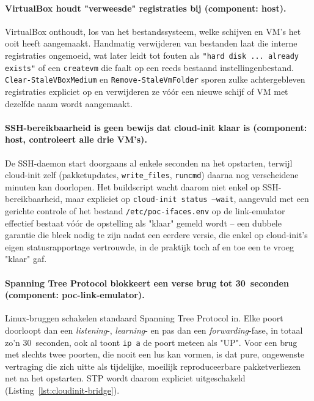 \paragraph{VirtualBox houdt "verweesde" registraties bij (component: host).} VirtualBox
onthoudt, los van het bestandssysteem, welke schijven en VM's het ooit heeft aangemaakt.
Handmatig verwijderen van bestanden laat die interne registraties ongemoeid, wat later
leidt tot fouten als \texttt{"hard disk ... already exists"} of een \texttt{createvm} die
faalt op een reeds bestaand instellingenbestand. \texttt{Clear-StaleVBoxMedium} en
\texttt{Remove-StaleVmFolder} sporen zulke achtergebleven registraties expliciet op en
verwijderen ze vóór een nieuwe schijf of VM met dezelfde naam wordt aangemaakt.

\paragraph{SSH-bereikbaarheid is geen bewijs dat cloud-init klaar is (component: host,
controleert alle drie VM's).} De SSH-daemon start doorgaans al enkele seconden na het
opstarten, terwijl cloud-init zelf (pakketupdates, \texttt{write\_files},
\texttt{runcmd}) daarna nog verscheidene minuten kan doorlopen. Het buildscript wacht
daarom niet enkel op SSH-bereikbaarheid, maar expliciet op \texttt{cloud-init status
--wait}, aangevuld met een gerichte controle of het bestand \texttt{/etc/poc-ifaces.env}
op de link-emulator effectief bestaat vóór de opstelling als "klaar" gemeld wordt -- een
dubbele garantie die bleek nodig te zijn nadat een eerdere versie, die enkel op
cloud-init's eigen statusrapportage vertrouwde, in de praktijk toch af en toe een te
vroeg "klaar" gaf.

\paragraph{Spanning Tree Protocol blokkeert een verse brug tot 30~seconden (component:
poc-link-emulator).} Linux-bruggen schakelen standaard Spanning Tree Protocol in. Elke
poort doorloopt dan een \textit{listening}-, \textit{learning}- en pas dan een
\textit{forwarding}-fase, in totaal zo'n 30~seconden, ook al toont \texttt{ip a} de poort
meteen als "UP". Voor een brug met slechts twee poorten, die nooit een lus kan vormen, is
dat pure, ongewenste vertraging die zich uitte als tijdelijke, moeilijk reproduceerbare
pakketverliezen net na het opstarten. STP wordt daarom expliciet uitgeschakeld
(Listing~\ref{lst:cloudinit-bridge}).

